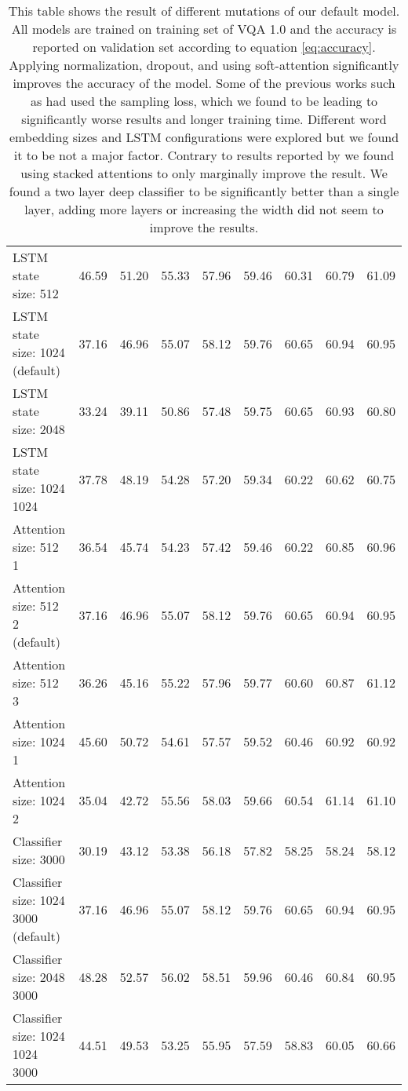\documentclass[10pt,twocolumn,letterpaper]{article}
\begin{document}
\begin{table*}
\begin{tabular}{l c c c c c c c c}
		\midrule
		LSTM state size: 512 & 46.59 & 51.20 & 55.33 & 57.96 & 59.46 & 60.31 & 60.79 & 61.09 \\
		LSTM state size: 1024 (default) & 37.16 & 46.96 & 55.07 & 58.12 & 59.76 & 60.65 & 60.94 & 60.95 \\
		LSTM state size: 2048 & 33.24 & 39.11 & 50.86 & 57.48 & 59.75 & 60.65 & 60.93 & 60.80 \\
		LSTM state size: 1024 1024 & 37.78 & 48.19 & 54.28 & 57.20 & 59.34 & 60.22 & 60.62 & 60.75 \\
		\midrule
		Attention size: 512 1 & 36.54 & 45.74 & 54.23 & 57.42 & 59.46 & 60.22 & 60.85 & 60.96 \\
		Attention size: 512 2 (default) & 37.16 & 46.96 & 55.07 & 58.12 & 59.76 & 60.65 & 60.94 & 60.95 \\
		Attention size: 512 3 & 36.26 & 45.16 & 55.22 & 57.96 & 59.77 & 60.60 & 60.87 & 61.12 \\
		Attention size: 1024 1 & 45.60 & 50.72 & 54.61 & 57.57 & 59.52 & 60.46 & 60.92 & 60.92 \\
		Attention size: 1024 2 & 35.04 & 42.72 & 55.56 & 58.03 & 59.66 & 60.54 & 61.14 & 61.10 \\
		\midrule
		Classifier size: 3000 & 30.19 & 43.12 & 53.38 & 56.18 & 57.82 & 58.25 & 58.24 & 58.12 \\
		Classifier size: 1024 3000 (default) & 37.16 & 46.96 & 55.07 & 58.12 & 59.76 & 60.65 & 60.94 & 60.95 \\
		Classifier size: 2048 3000 & 48.28 & 52.57 & 56.02 & 58.51 & 59.96 & 60.46 & 60.84 & 60.95 \\
		Classifier size: 1024 1024 3000 & 44.51 & 49.53 & 53.25 & 55.95 & 57.59 & 58.83 & 60.05 & 60.66 \\
		\bottomrule
	\end{tabular}
	\vspace{.1cm}
	\caption{This table shows the result of different mutations of our default model. All models are trained on training set of VQA 1.0 \cite{Antol2015VQAVQ} and the accuracy is reported on validation set according to equation \ref{eq:accuracy}.  Applying  normalization, dropout, and using soft-attention significantly improves the accuracy of the model. Some of the previous works such as \cite{Fukui2016MultimodalCB} had used the sampling loss, which we found to be leading to significantly worse results and longer training time. Different word embedding sizes and LSTM configurations were explored but we found it to be not a major factor.  Contrary to results reported by \cite{Yang2016StackedAN} we found using stacked attentions to only marginally improve the result. We found a two layer deep classifier to be significantly better than a single layer, adding more layers or increasing the width did not seem to improve the results.} 
	\label{table:baselines}
\end{table*}
\end{document}
